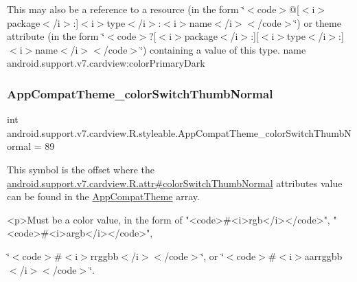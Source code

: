 This may also be a reference to a resource (in the form \char`\"{}$<$code$>$@\mbox{[}$<$i$>$package$<$/i$>$\+:\mbox{]}$<$i$>$type$<$/i$>$\+:$<$i$>$name$<$/i$>$$<$/code$>$\char`\"{}) or theme attribute (in the form \char`\"{}$<$code$>$?\mbox{[}$<$i$>$package$<$/i$>$\+:\mbox{]}\mbox{[}$<$i$>$type$<$/i$>$\+:\mbox{]}$<$i$>$name$<$/i$>$$<$/code$>$\char`\"{}) containing a value of this type.  name android.\+support.\+v7.\+cardview\+:color\+Primary\+Dark \mbox{\label{classandroid_1_1support_1_1v7_1_1cardview_1_1R_1_1styleable_a992cb4f1559d830c77adbb17b8d9d0b6}} 
\subsubsection{\texorpdfstring{App\+Compat\+Theme\+\_\+color\+Switch\+Thumb\+Normal}{AppCompatTheme\_colorSwitchThumbNormal}}
{\footnotesize\ttfamily int android.\+support.\+v7.\+cardview.\+R.\+styleable.\+App\+Compat\+Theme\+\_\+color\+Switch\+Thumb\+Normal = 89\hspace{0.3cm}{\ttfamily [static]}}

This symbol is the offset where the \hyperlink{classandroid_1_1support_1_1v7_1_1cardview_1_1R_1_1attr_a826fee7b51341a78531c2b55cea2e1b5}{android.\+support.\+v7.\+cardview.\+R.\+attr\#color\+Switch\+Thumb\+Normal} attribute\textquotesingle{}s value can be found in the \hyperlink{classandroid_1_1support_1_1v7_1_1cardview_1_1R_1_1styleable_a52e6f69f954ecc2622d72c0b4d298938}{App\+Compat\+Theme} array.

\begin{DoxyVerb}      <p>Must be a color value, in the form of "<code>#<i>rgb</i></code>", "<code>#<i>argb</i></code>",
\end{DoxyVerb}
 \char`\"{}$<$code$>$\#$<$i$>$rrggbb$<$/i$>$$<$/code$>$\char`\"{}, or \char`\"{}$<$code$>$\#$<$i$>$aarrggbb$<$/i$>$$<$/code$>$\char`\"{}. 


